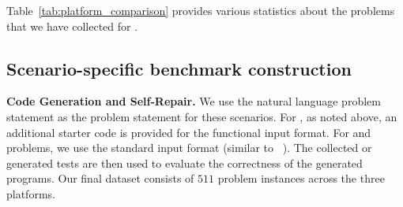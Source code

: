 \noindent Table~\ref*{tab:platform_comparison} provides various statistics about the problems that we have collected for \livecodebench{}. 



\subsection{Scenario-specific benchmark construction}
\label{subsec:scenario-specific}

\textbf{Code Generation and Self-Repair.}
We use the natural language problem statement as the problem statement for these scenarios. 
For \leetcode{}, as noted above, an additional starter code is provided for the functional input format.
For \atcoder{} and \codeforces{} problems, we use the standard input format (similar to ~\citep{hendrycks2021measuring}). 
The collected or generated tests are then used to evaluate the correctness of the generated programs.
Our final dataset consists of $511$ problem instances across the three platforms. 

